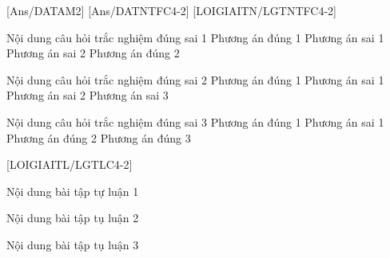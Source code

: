 [Ans/DATAM2]
[Ans/DATNTFC4-2]
\luulgEXTF
{}[LOIGIAITN/LGTNTFC4-2]
\begin{ex}
	Nội dung câu hỏi trắc nghiệm đúng sai 1
	\choiceTF
	{\True Phương án đúng 1}
	{ Phương án sai 1}
	{Phương án sai 2}
	{\True Phương án đúng 2}
\end{ex}
\begin{ex}
	Nội dung câu hỏi trắc nghiệm đúng sai 2
	\choiceTF
	{\True Phương án đúng 1}
	{ Phương án sai 1}
	{ Phương án sai 2}
	{Phương án sai 3}
\end{ex}
\begin{ex}
	Nội dung câu hỏi trắc nghiệm đúng sai 3
	\choiceTF
	{\True Phương án đúng 1}
	{ Phương án sai 1}
	{\True Phương án đúng 2}
	{\True Phương án đúng 3}
\end{ex}

[LOIGIAITL/LGTLC4-2]
\luuloigiaibt
\begin{bt}
	Nội dung bài tập tự luận 1
\end{bt}
\begin{bt}
	Nội dung bài tập tụ luận 2
\end{bt}
\begin{bt}
	Nội dung bài tập tụ luận 3
\end{bt}

\newpage
{}

\\




